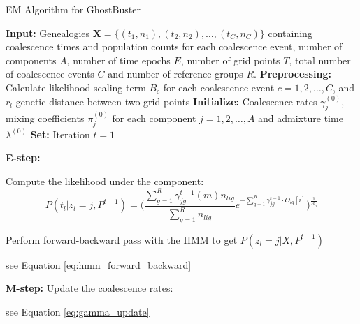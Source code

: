 \begin{algorithm}
\caption{EM Algorithm for GhostBuster}
\begin{algorithmic}[1]
\State \textbf{Input:} Genealogies $\mathbf{X} = \{(t_1,n_1), (t_2,n_2), \dots, (t_C,n_C)\}$ containing coalescence times and population counts for each coalescence event, number of components $A$, number of time epochs $E$, number of grid points $T$, total number of coalescence events $C$ and number of reference groups $R$.
\State \textbf{Preprocessing:} Calculate likelihood scaling term $B_c$ for each coalescence event $c = 1, 2, \dots, C$, and $r_l$ genetic distance between two grid points
\State \textbf{Initialize:} Coalescence rates $\gamma_j^{(0)}$, mixing coefficients $\pi_j^{(0)}$ for each component $j = 1, 2, \dots, A$ and admixture time $\lambda^{(0)}$ 
\State \textbf{Set:} Iteration $t = 1$

\Repeat

    \State \textbf{E-step:} 
    

    
                        

            \vspace{2mm}
            
            \State Compute the likelihood under the component:
            \[
               P(t_l \vert z_l=j, P^{t-1}) =  \Big( \frac{\sum_{g=1}^R\gamma^{t-1}_{jg}(m)n_{lig}}{\sum_{g=1}^R n_{lig}}e^{-\sum_{g=1}^R \gamma^{t-1}_{jg} \cdot O_{lg}[i]} \Big)^{\frac{1}{B_{li}}}
            \]
        \EndFor
        
        \State Perform forward-backward pass with the HMM to get $P(z_l = j \vert X, P^{t-1})$ 

        \hspace{7mm} see Equation \ref{eq:hmm_forward_backward}

        
    \EndFor
    
    \State \textbf{M-step:}
        \State Update the coalescence rates:
        
        \hspace{7mm} see Equation \ref{eq:gamma_update}


\end{algorithmic}
\end{algorithm}
